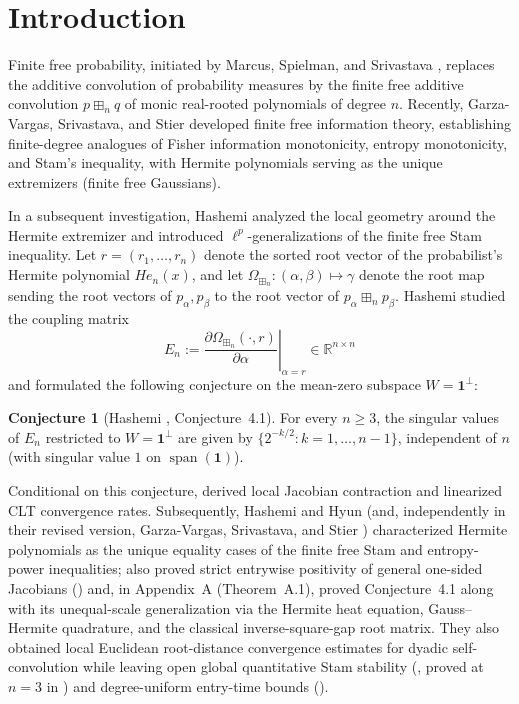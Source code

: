 \documentclass[11pt,a4paper]{article}
\theoremstyle{definition}
\newtheorem{conjecture}[theorem]{Conjecture}
\DeclareMathOperator{\Span}{span}
\newcommand{\R}{\mathbb{R}}
\newcommand{\one}{\mathbf{1}}
\begin{document}
\section{Introduction}

Finite free probability, initiated by Marcus, Spielman, and Srivastava \cite{MSS2022}, replaces the additive convolution of probability measures by the finite free additive convolution $p \boxplus_n q$ of monic real-rooted polynomials of degree $n$. Recently, Garza-Vargas, Srivastava, and Stier \cite{GSS2026} developed finite free information theory, establishing finite-degree analogues of Fisher information monotonicity, entropy monotonicity, and Stam's inequality, with Hermite polynomials serving as the unique extremizers (finite free Gaussians).

In a subsequent investigation, Hashemi \cite{Hashemi2026} analyzed the local geometry around the Hermite extremizer and introduced $\ell^p$-generalizations of the finite free Stam inequality. Let $r = (r_1, \dots, r_n)$ denote the sorted root vector of the probabilist's Hermite polynomial $He_n(x)$, and let $\Omega_{\boxplus_n} : (\alpha, \beta) \mapsto \gamma$ denote the root map sending the root vectors of $p_\alpha, p_\beta$ to the root vector of $p_\alpha \boxplus_n p_\beta$. Hashemi studied the coupling matrix
\[
E_n := \left.\frac{\partial \Omega_{\boxplus_n}(\cdot, r)}{\partial \alpha}\right|_{\alpha = r} \in \R^{n \times n}
\]
and formulated the following conjecture on the mean-zero subspace $W = \one^\perp$:

\begin{conjecture}[Hashemi \cite{Hashemi2026}, Conjecture~4.1]
For every $n \ge 3$, the singular values of $E_n$ restricted to $W = \one^\perp$ are given by $\{2^{-k/2} : k = 1, \dots, n-1\}$, independent of $n$ (with singular value $1$ on $\Span(\one)$).
\end{conjecture}

Conditional on this conjecture, \cite{Hashemi2026} derived local Jacobian contraction and linearized CLT convergence rates. Subsequently, Hashemi and Hyun \cite{HH2026} (and, independently in their revised version, Garza-Vargas, Srivastava, and Stier \cite[Theorems~5.6 and~6.5]{GSS2026}) characterized Hermite polynomials as the unique equality cases of the finite free Stam and entropy-power inequalities; \cite{HH2026} also proved strict entrywise positivity of general one-sided Jacobians (\cite[Theorem~5.1]{HH2026}) and, in Appendix~A (Theorem~A.1), proved Conjecture~4.1 along with its unequal-scale generalization via the Hermite heat equation, Gauss--Hermite quadrature, and the classical inverse-square-gap root matrix. They also obtained local Euclidean root-distance convergence estimates for dyadic self-convolution while leaving open global quantitative Stam stability (\cite[Conjecture~8.1 / eq.~(101)]{HH2026}, proved at $n=3$ in \cite[\S 8]{HH2026}) and degree-uniform entry-time bounds (\cite[Question~8.5]{HH2026}).
\end{document}
